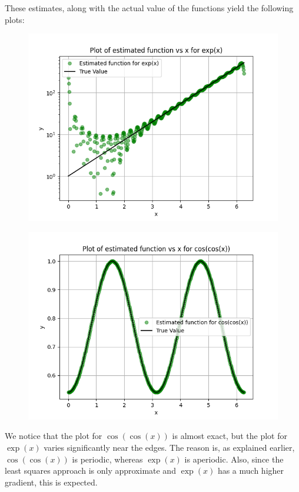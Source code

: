 \documentclass[11pt, a4paper]{article}
\begin{document}
These estimates, along with the actual value of the functions yield the following plots:

\begin{figure}[H]
     \centering
     \includegraphics[scale=0.8]{Figure_13.png}
\end{figure}

\begin{figure}[H]
     \centering
     \includegraphics[scale=0.8]{Figure_14.png}
\end{figure}


We notice that the plot for $\cos(\cos(x))$ is almost exact, but the plot for $\exp(x)$ varies significantly near the edges. The reason is, as explained earlier, $\cos(\cos(x))$ is periodic, whereas $\exp(x)$ is aperiodic. Also, since the least squares approach is only approximate and $\exp(x)$ has a much higher gradient, this is expected. 
\end{document}
